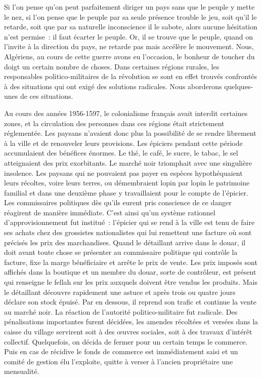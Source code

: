 \documentclass[french,twoside]{book} %
\begin{document}
\bigbreak
\noindent Si l’on pense qu’on peut parfaitement diriger un pays sans que le peuple y mette le nez, si l’on pense que le peuple par sa seule présence trouble le jeu, soit qu’il le retarde, soit que par sa naturelle inconscience il le sabote, alors aucune hésitation n’est permise : il faut écarter le peuple. Or, il se trouve que le peuple, quand on l’invite à la direction du pays, ne retarde pas mais accélère le mouvement. Nous, Algériens, au cours de cette guerre avons eu l’occasion, le bonheur de toucher du doigt un certain nombre de choses. Dans certaines régions rurales, les responsables politico-militaires de la révolution se sont en effet trouvés confrontés à des situations qui ont exigé des solutions radicales. Nous aborderons quelques-unes de ces situations.\par
\bigbreak
\noindent Au cours des années 1956-1597, le colonialisme français avait interdit certaines zones, et la circulation des personnes dans ces régions était strictement réglementée. Les paysans   n’avaient donc plus la possibilité de se rendre librement à la ville et de renouveler leurs provisions. Les épiciers pendant cette période accumulaient des bénéfices énormes. Le thé, le café, le sucre, le tabac, le sel atteignaient des prix exorbitants. Le marché noir triomphait avec une singulière insolence. Les paysans qui ne pouvaient pas payer en espèces hypothéquaient leurs récoltes, voire leurs terres, ou démembraient lopin par lopin le patrimoine familial et dans une deuxième phase y travaillaient pour le compte de l’épicier. Les commissaires politiques dès qu’ils eurent pris conscience de ce danger réagirent de manière immédiate. C’est ainsi qu’un système rationnel d’approvisionnement fut institué : l’épicier qui se rend à la ville est tenu de faire ses achats chez des grossistes nationalistes qui lui remettent une facture où sont précisés les prix des marchandises. Quand le détaillant arrive dans le douar, il doit avant toute chose se présenter au commissaire politique qui contrôle la facture, fixe la marge bénéficiaire et arrête le prix de vente. Les prix imposés sont affichés dans la boutique et un membre du douar, sorte de contrôleur, est présent qui renseigne le fellah sur les prix auxquels doivent être vendus les produits. Mais le détaillant découvre rapidement une astuce et après trois ou quatre jours déclare son stock épuisé. Par en dessous, il reprend son trafic et continue la vente au marché noir. La réaction de l’autorité politico-militaire fut radicale. Des pénalisations importantes furent décidées, les amendes récoltées et versées dans la caisse du village servirent soit à des œuvres sociales, soit à des travaux d’intérêt collectif. Quelquefois, on décida de fermer pour un certain temps le commerce. Puis en cas de récidive le fonds de commerce est immédiatement saisi et un comité de gestion élu l’exploite, quitte à verser à l’ancien propriétaire une mensualité.\par
\end{document}
